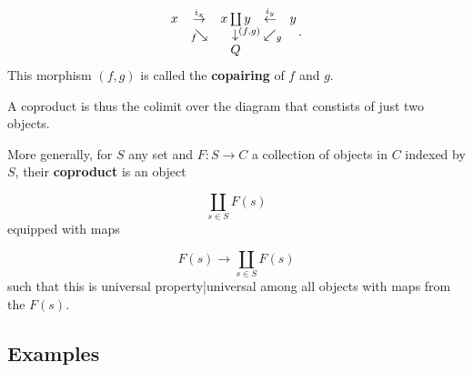 \documentclass[preprint, 5p, 10pt]{elsarticle}
\theoremstyle{plain}
\def\mathrlap{\mathpalette\mathrlapinternal}
\def\mathrlapinternal#1#2{\rlap{$\mathsurround=0pt#1{#2}$}}
\newcommand{\itexarray}[1]{\begin{matrix}#1\end{matrix}}
\begin{document}
\begin{displaymath}
\itexarray{
    x &\stackrel{i_x}{\to}& x \coprod y &\stackrel{i_y}{\leftarrow}&
    y
    \\
    & {}_{\mathrlap{f}}\searrow & \downarrow^{\mathrlap{(f,g)}} & \swarrow_{\mathrlap{g}}
    \\
    && Q
  }
  \,.
\end{displaymath}
This morphism $(f,g)$ is called the \textbf{copairing} of $f$ and $g$.



A coproduct is thus the colimit over the diagram that constists of just two objects.

More generally, for $S$ any set and $F : S \to C$ a collection of objects in $C$ indexed by $S$, their \textbf{coproduct} is an object

\begin{displaymath}
\coprod_{s \in S} F(s)
\end{displaymath}
equipped with maps

\begin{displaymath}
F(s)  \to \coprod_{s \in S} F(s)
\end{displaymath}
such that this is universal property|universal among all objects with maps from the $F(s)$.

\hypertarget{examples_7}{}\subsection*{{Examples}}\label{examples_7}
\end{document}
